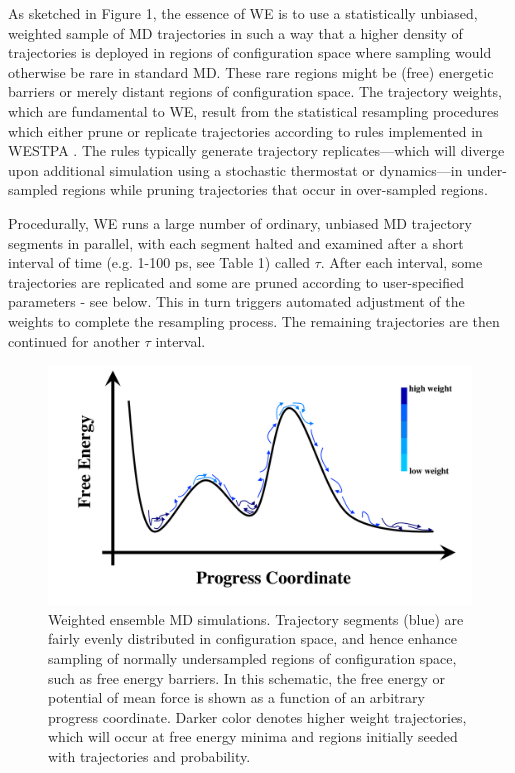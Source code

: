 \documentclass[9pt,tutorial,ASAPversion]{livecoms}
\begin{document}
As sketched in Figure 1, the essence of WE is to use a statistically unbiased, weighted sample of MD trajectories in such a way that a higher density of trajectories is deployed in regions of configuration space where sampling would otherwise be rare in standard MD. 
These rare regions might be (free) energetic barriers or merely distant regions of configuration space. 
The trajectory weights, which are fundamental to WE, result from the statistical resampling procedures which either prune or replicate trajectories according to rules implemented in WESTPA \citep{HuberKim1996,Zhang2010,Zwier2015}. 
The rules typically generate trajectory replicates---which will diverge upon additional simulation using a stochastic thermostat or dynamics---in under-sampled regions while pruning trajectories that occur in over-sampled regions.  

Procedurally, WE runs a large number of ordinary, unbiased MD trajectory segments in parallel, with each segment halted and examined after a short interval of time (e.g. 1-100 ps, see Table 1) called $\tau$. 
After each interval, some trajectories are replicated and some are pruned according to user-specified parameters - see below. 
This in turn triggers automated adjustment of the weights to complete the resampling process. 
The remaining trajectories are then continued for another $\tau$ interval.

\begin{figure}
\includegraphics[width=\linewidth]{Figure1.png}
\caption{Weighted ensemble MD simulations. 
Trajectory segments (blue) are fairly evenly distributed in configuration space, and hence enhance sampling of normally undersampled regions of configuration space, such as free energy barriers. 
In this schematic, the free energy or potential of mean force is shown as a function of an arbitrary progress coordinate.
Darker color denotes higher weight trajectories, which will occur at free energy minima and regions initially seeded with trajectories and probability.}
\label{fig:view}
\end{figure}
\end{document}
